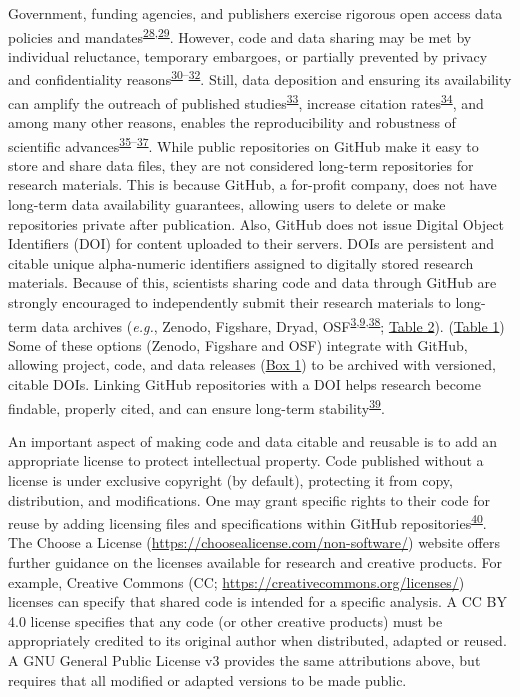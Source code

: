 Government, funding agencies, and publishers exercise rigorous open access data policies and mandates\textsuperscript{\protect\hyperlink{ref-PLmDFZrm}{28},\protect\hyperlink{ref-1Hcf13Q0k}{29}}.
However, code and data sharing may be met by individual reluctance, temporary embargoes, or partially prevented by privacy and confidentiality reasons\textsuperscript{\protect\hyperlink{ref-1Ch6LSHef}{30}--\protect\hyperlink{ref-1CzUZwyU2}{32}}.
Still, data deposition and ensuring its availability can amplify the outreach of published studies\textsuperscript{\protect\hyperlink{ref-666HppfO}{33}}, increase citation rates\textsuperscript{\protect\hyperlink{ref-1CcAUn3Lu}{34}}, and among many other reasons, enables the reproducibility and robustness of scientific advances\textsuperscript{\protect\hyperlink{ref-4LaijDIZ}{35}--\protect\hyperlink{ref-1HZdsK5Kn}{37}}.
While public repositories on GitHub make it easy to store and share data files, they are not considered long-term repositories for research materials.
This is because GitHub, a for-profit company, does not have long-term data availability guarantees, allowing users to delete or make repositories private after publication.
Also, GitHub does not issue Digital Object Identifiers (DOI) for content uploaded to their servers.
DOIs are persistent and citable unique alpha-numeric identifiers assigned to digitally stored research materials.
Because of this, scientists sharing code and data through GitHub are strongly encouraged to independently submit their research materials to long-term data archives (\emph{e.g.}, Zenodo, Figshare, Dryad, OSF\textsuperscript{\protect\hyperlink{ref-10ghgV3S8}{3},\protect\hyperlink{ref-kEX5dgzK}{9},\protect\hyperlink{ref-1Du6fzB8g}{38}}; \protect\hyperlink{tbl:compare}{Table 2}). (\protect\hyperlink{tbl:roles}{Table 1})
Some of these options (Zenodo, Figshare and OSF) integrate with GitHub, allowing project, code, and data releases (\protect\hyperlink{definitions}{Box 1}) to be archived with versioned, citable DOIs.
Linking GitHub repositories with a DOI helps research become findable, properly cited, and can ensure long-term stability\textsuperscript{\protect\hyperlink{ref-iIEKCTLU}{39}}.

An important aspect of making code and data citable and reusable is to add an appropriate license to protect intellectual property.
Code published without a license is under exclusive copyright (by default), protecting it from copy, distribution, and modifications.
One may grant specific rights to their code for reuse by adding licensing files and specifications within GitHub repositories\textsuperscript{\protect\hyperlink{ref-TOsASkn5}{40}}.
The Choose a License (\url{https://choosealicense.com/non-software/}) website offers further guidance on the licenses available for research and creative products.
For example, Creative Commons (CC; \url{https://creativecommons.org/licenses/}) licenses can specify that shared code is intended for a specific analysis.
A CC BY 4.0 license specifies that any code (or other creative products) must be appropriately credited to its original author when distributed, adapted or reused.
A GNU General Public License v3 provides the same attributions above, but requires that all modified or adapted versions to be made public.

